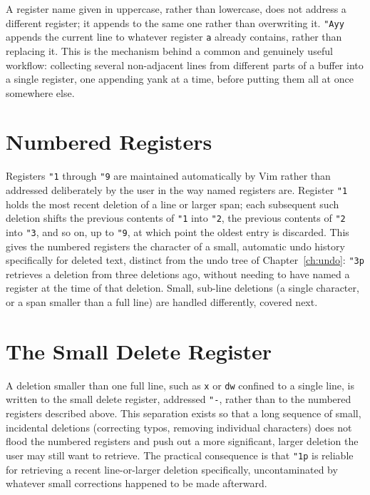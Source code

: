A register name given in uppercase, rather than lowercase, does not address a different register; it appends to the same one rather than overwriting it. \texttt{"Ayy} appends the current line to whatever register \texttt{a} already contains, rather than replacing it. This is the mechanism behind a common and genuinely useful workflow: collecting several non-adjacent lines from different parts of a buffer into a single register, one appending yank at a time, before putting them all at once somewhere else.

\section{Numbered Registers}

Registers \texttt{"1} through \texttt{"9} are maintained automatically by Vim rather than addressed deliberately by the user in the way named registers are. Register \texttt{"1} holds the most recent deletion of a line or larger span; each subsequent such deletion shifts the previous contents of \texttt{"1} into \texttt{"2}, the previous contents of \texttt{"2} into \texttt{"3}, and so on, up to \texttt{"9}, at which point the oldest entry is discarded. This gives the numbered registers the character of a small, automatic undo history specifically for deleted text, distinct from the undo tree of Chapter~\ref{ch:undo}: \texttt{"3p} retrieves a deletion from three deletions ago, without needing to have named a register at the time of that deletion. Small, sub-line deletions (a single character, or a span smaller than a full line) are handled differently, covered next.

\section{The Small Delete Register}

A deletion smaller than one full line, such as \texttt{x} or \texttt{dw} confined to a single line, is written to the small delete register, addressed \texttt{"-}, rather than to the numbered registers described above. This separation exists so that a long sequence of small, incidental deletions (correcting typos, removing individual characters) does not flood the numbered registers and push out a more significant, larger deletion the user may still want to retrieve. The practical consequence is that \texttt{"1p} is reliable for retrieving a recent line-or-larger deletion specifically, uncontaminated by whatever small corrections happened to be made afterward.

